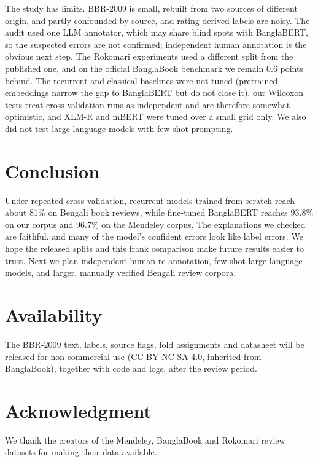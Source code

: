 \documentclass[conference,a4paper]{IEEEtran}
\begin{document}
The study has limits. BBR-2009 is small, rebuilt from two sources of different origin, and partly confounded by source, and rating-derived labels are noisy. The audit used one LLM annotator, which may share blind spots with BanglaBERT, so the suspected errors are not confirmed; independent human annotation is the obvious next step. The Rokomari experiments used a different split from the published one, and on the official BanglaBook benchmark we remain 0.6 points behind. The recurrent and classical baselines were not tuned (pretrained embeddings narrow the gap to BanglaBERT but do not close it), our Wilcoxon tests treat cross-validation runs as independent and are therefore somewhat optimistic, and XLM-R and mBERT were tuned over a small grid only. We also did not test large language models with few-shot prompting.

\section{Conclusion}
Under repeated cross-validation, recurrent models trained from scratch reach about 81\% on Bengali book reviews, while fine-tuned BanglaBERT reaches 93.8\% on our corpus and 96.7\% on the Mendeley corpus. The explanations we checked are faithful, and many of the model's confident errors look like label errors. We hope the released splits and this frank comparison make future results easier to trust. Next we plan independent human re-annotation, few-shot large language models, and larger, manually verified Bengali review corpora.

\section*{Availability}
The BBR-2009 text, labels, source flags, fold assignments and datasheet will be released for non-commercial use (CC BY-NC-SA 4.0, inherited from BanglaBook), together with code and logs, after the review period.

\section*{Acknowledgment}
We thank the creators of the Mendeley, BanglaBook and Rokomari review datasets for making their data available.



\end{document}
